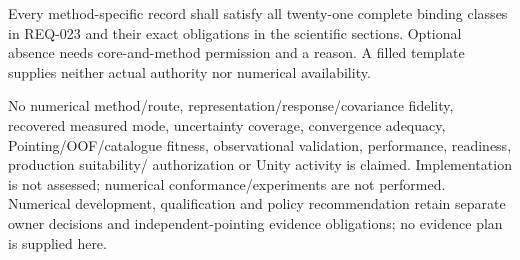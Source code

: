 {{Every method-specific record shall satisfy all twenty-one complete binding
classes in REQ-023 and their exact obligations in the scientific sections.
Optional absence needs core-and-method permission and a reason. A filled
template supplies neither actual authority nor numerical availability.

No numerical method/route, representation/response/covariance fidelity, recovered
measured mode, uncertainty coverage, convergence adequacy, Pointing/OOF/catalogue
fitness, observational validation, performance, readiness, production suitability/
authorization or Unity activity is claimed. Implementation is not assessed;
numerical conformance/experiments are not performed. Numerical development,
qualification and policy recommendation retain separate owner decisions and
independent-pointing evidence obligations; no evidence plan is supplied here.
}}
